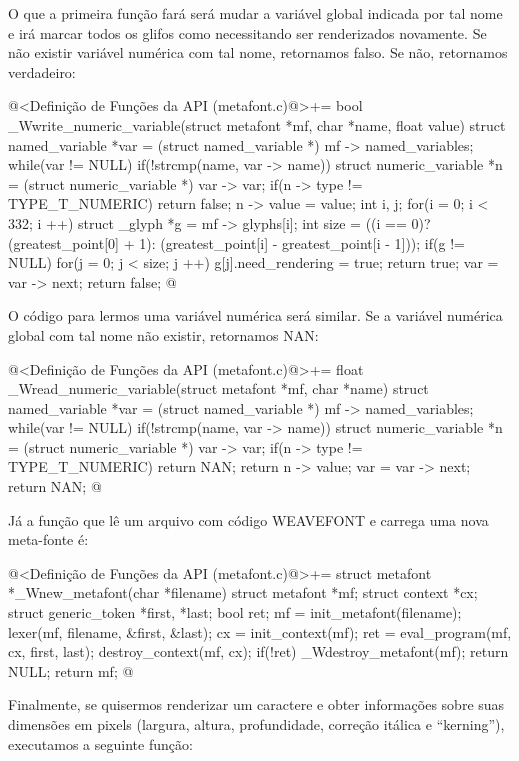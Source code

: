 {{{{{{O que a primeira função fará será mudar a variável global indicada por
tal nome e irá marcar todos os glifos como necessitando ser
renderizados novamente. Se não existir variável numérica com tal nome,
retornamos falso. Se não, retornamos verdadeiro:

\iniciocodigo
@<Definição de Funções da API (metafont.c)@>+=
bool _Wwrite_numeric_variable(struct metafont *mf, char *name, float value){
  struct named_variable *var = (struct named_variable *) mf -> named_variables;
  while(var != NULL){
    if(!strcmp(name, var -> name)){
      struct numeric_variable *n = (struct numeric_variable *) var -> var;
      if(n -> type != TYPE_T_NUMERIC)
        return false;
      n -> value = value;
      {
        int i, j;
        for(i = 0; i < 332; i ++){
          struct _glyph *g = mf -> glyphs[i];
          int size = ((i == 0)?(greatest_point[0] + 1):
                               (greatest_point[i] - greatest_point[i - 1]));
          if(g != NULL){
            for(j = 0; j < size; j ++)
                g[j].need_rendering = true;
          }
        }
      }
      return true;
    }
    var = var -> next;
  }
  return false;
}
@
\fimcodigo

O código para lermos uma variável numérica será similar. Se a variável
numérica global com tal nome não existir, retornamos NAN:

\iniciocodigo
@<Definição de Funções da API (metafont.c)@>+=
float _Wread_numeric_variable(struct metafont *mf, char *name){
  struct named_variable *var = (struct named_variable *) mf -> named_variables;
  while(var != NULL){
    if(!strcmp(name, var -> name)){
      struct numeric_variable *n = (struct numeric_variable *) var -> var;
      if(n -> type != TYPE_T_NUMERIC)
        return NAN;
      return n -> value;
    }
    var = var -> next;
  }
  return NAN;
}
@
\fimcodigo


Já a função que lê um arquivo com código WEAVEFONT e carrega uma nova
meta-fonte é:

\iniciocodigo
@<Definição de Funções da API (metafont.c)@>+=
struct metafont *_Wnew_metafont(char *filename){
  struct metafont *mf;
  struct context *cx;
  struct generic_token *first, *last;
  bool ret;
  mf = init_metafont(filename);
  lexer(mf, filename, &first, &last);
  cx = init_context(mf);
  ret = eval_program(mf, cx, first, last);
  destroy_context(mf, cx);
  if(!ret){
    _Wdestroy_metafont(mf);
    return NULL;
  }
  return mf;
}
@
\fimcodigo

Finalmente, se quisermos renderizar um caractere e obter informações
sobre suas dimensões em pixels (largura, altura, profundidade,
correção itálica e ``kerning''), executamos a seguinte função:

}}}}}}
